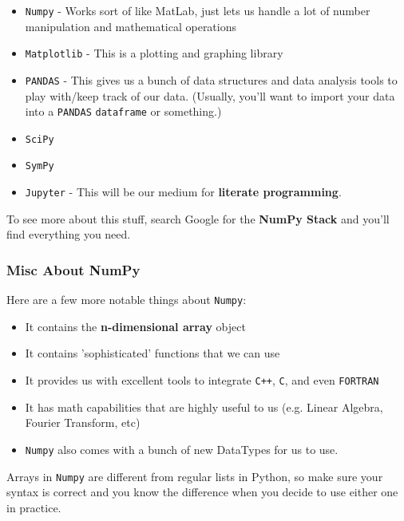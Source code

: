 \documentclass[english, 10pt]{article}
\begin{document}
\begin{itemize}
	\item \texttt{Numpy} - Works sort of like MatLab, just lets us handle a lot of number manipulation and mathematical operations
	\item \texttt{Matplotlib} - This is a plotting and graphing library
	\item \texttt{PANDAS} - This gives us a bunch of data structures and data analysis tools to play with/keep track of our data. (Usually, you'll want to import your data into a \texttt{PANDAS} \texttt{dataframe} or something.)
	\item \texttt{SciPy}
	\item \texttt{SymPy}
	\item \texttt{Jupyter} - This will be our medium for \textbf{literate programming}.
\end{itemize}

To see more about this stuff, search Google for the \textbf{NumPy Stack} and you'll find everything you need.

\subsubsection{Misc About NumPy}

Here are a few more notable things about \texttt{Numpy}:

\begin{itemize}
	\item It contains the \textbf{n-dimensional array} object
	\item It contains 'sophisticated' functions that we can use
	\item It provides us with excellent tools to integrate \texttt{C++}, \texttt{C}, and even \texttt{FORTRAN}
	\item It has math capabilities that are highly useful to us (e.g. Linear Algebra, Fourier Transform, etc)
	\item \texttt{Numpy} also comes with a bunch of new DataTypes for us to use.
\end{itemize}

\begin{tcolorbox}[title=Aside: Numpy Arrays,colframe=black,colback=white,arc=0pt,fonttitle=\bfseries]
Arrays in \texttt{Numpy} are different from regular lists in Python, so make sure your syntax is correct and you know the difference when you decide to use either one in practice.
\end{tcolorbox}
\end{document}
